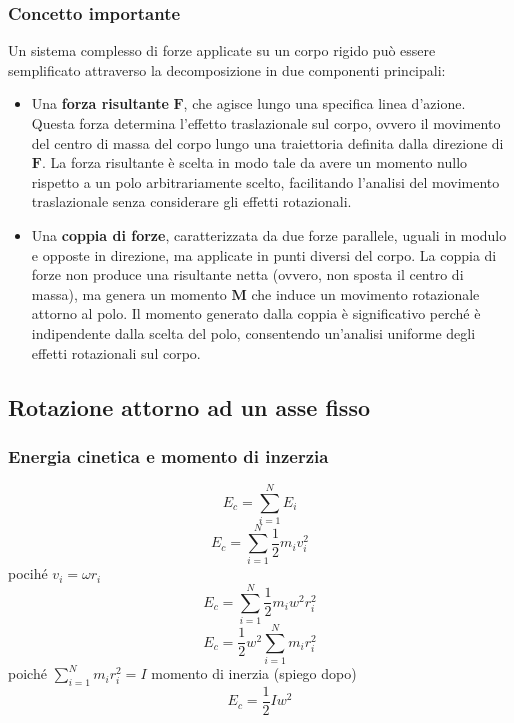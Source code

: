 \documentclass[twoside]{article}
\begin{document}
\subsubsection{Concetto importante}
Un sistema complesso di forze applicate su un corpo rigido può essere semplificato attraverso la decomposizione in due componenti principali:
\begin{itemize}
  \item Una \textbf{forza risultante} \( \mathbf{F} \), che agisce lungo una specifica linea d'azione. Questa forza determina l'effetto traslazionale sul corpo, ovvero il movimento del centro di massa del corpo lungo una traiettoria definita dalla direzione di \( \mathbf{F} \). La forza risultante è scelta in modo tale da avere un momento nullo rispetto a un polo arbitrariamente scelto, facilitando l'analisi del movimento traslazionale senza considerare gli effetti rotazionali.
  \item Una \textbf{coppia di forze}, caratterizzata da due forze parallele, uguali in modulo e opposte in direzione, ma applicate in punti diversi del corpo. La coppia di forze non produce una risultante netta (ovvero, non sposta il centro di massa), ma genera un momento \( \mathbf{M} \) che induce un movimento rotazionale attorno al polo. Il momento generato dalla coppia è significativo perché è indipendente dalla scelta del polo, consentendo un'analisi uniforme degli effetti rotazionali sul corpo.
\end{itemize}

\subsection{Rotazione attorno ad un asse fisso}
\subsubsection{Energia cinetica e momento di inzerzia}
\begin{equation*}
  E_c = \sum_{i=1}^{N} E_i
\end{equation*}
\begin{equation*}
  E_c = \sum_{i=1}^{N} \frac{1}{2} m_i v_i^2
\end{equation*}
pocihé \(v_i = \omega r_i\)
\begin{equation*}
  E_c =  \sum_{i=1}^{N}\frac{1}{2} m_i w^2 r_i^2
\end{equation*}
\begin{equation*}
  E_c = \frac{1}{2} w^2 \sum_{i=1}^{N} m_i r_i^2
\end{equation*}
poiché \(\displaystyle \sum_{i=1}^{N} m_i r_i^2 = I\) momento di inerzia (spiego dopo)
\begin{equation}
  \boxed{E_c = \frac{1}{2} I w^2}
\end{equation}
\end{document}
